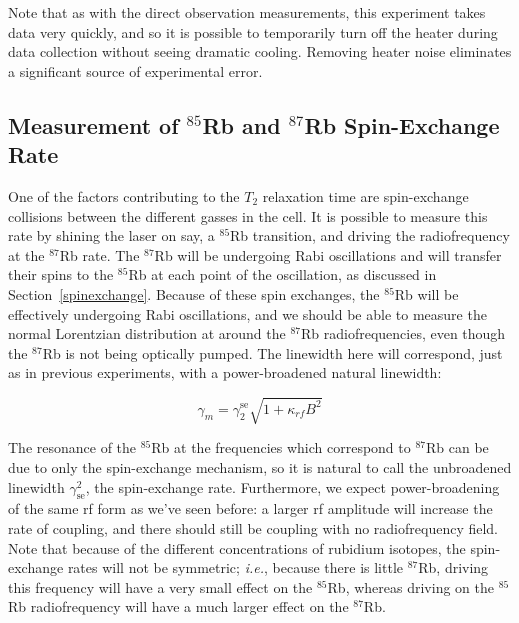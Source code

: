 Note that as with the direct observation measurements, this experiment takes data very quickly, and so it is possible to temporarily turn off the heater during data collection without seeing dramatic cooling. Removing heater noise eliminates a significant source of experimental error.

\subsection{Measurement of $^{85}$Rb and $^{87}$Rb Spin-Exchange Rate}

One of the factors contributing to the $T_{2}$ relaxation time are spin-exchange collisions between the different gasses in the cell. It is possible to measure this rate by shining the laser on say, a $^{85}$Rb transition, and driving the radiofrequency at the $^{87}$Rb rate. The $^{87}$Rb will be undergoing Rabi oscillations and will transfer their spins to the $^{85}$Rb at each point of the oscillation, as discussed in Section~\ref{spinexchange}. Because of these spin exchanges, the $^{85}$Rb will be effectively undergoing Rabi oscillations, and we should be able to measure the normal Lorentzian distribution at around the $^{87}$Rb radiofrequencies, even though the $^{87}$Rb is not being optically pumped. The linewidth here will correspond, just as in previous experiments, with a power-broadened natural linewidth:

\begin{equation}
\gamma_{m} = \gamma_{2}^{\mathrm{se}} \sqrt{1+\kappa_{rf} B^{2}} \label{eq:sebroad}
\end{equation}

The resonance of the $^{85}$Rb at the frequencies which correspond to $^{87}$Rb can be due to only the spin-exchange mechanism, so it is natural to call the unbroadened linewidth $\gamma^2_{\mathrm{se}}$, the spin-exchange rate. Furthermore, we expect power-broadening of the same rf form as we've seen before: a larger rf amplitude will increase the rate of coupling, and there should still be coupling with no radiofrequency field. Note that because of the different concentrations of rubidium isotopes, the spin-exchange rates will not be symmetric; \emph{i.e.}, because there is little  $^{87}$Rb, driving this frequency will have a very small effect on the $^{85}$Rb, whereas driving on the  $^{85}$Rb radiofrequency will have a much larger effect on the  $^{87}$Rb.

